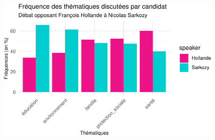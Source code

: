 \documentclass[
  letterpaper,
  DIV=11,
  numbers=noendperiod]{scrartcl}
\begin{document}
\begin{figure}[H]

{\centering \includegraphics{Travail-Session_files/figure-pdf/unnamed-chunk-2-4.pdf}

}

\end{figure}
\end{document}
